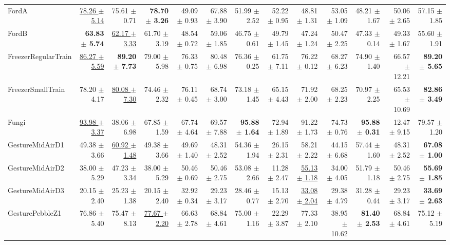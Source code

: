 \begin{landscape}
\begin{longtable}{lrrrrrrrrrrrr}
FordA & \underline{78.26 $\pm$ 5.14} & 75.61 $\pm$ 0.71 & \textbf{78.70 $\pm$ 3.26} & 49.09 $\pm$ 0.93 & 67.88 $\pm$ 3.90 & 51.99 $\pm$ 2.52 & 52.22 $\pm$ 0.95 & 48.81 $\pm$ 1.31 & 53.05 $\pm$ 1.09 & 48.21 $\pm$ 1.67 & 50.06 $\pm$ 2.65 & 57.15 $\pm$ 1.85 \\
FordB & \textbf{63.83 $\pm$ 5.74} & \underline{62.17 $\pm$ 3.33} & 61.70 $\pm$ 3.19 & 48.54 $\pm$ 0.72 & 59.06 $\pm$ 1.85 & 46.75 $\pm$ 0.61 & 49.79 $\pm$ 1.45 & 47.24 $\pm$ 1.24 & 50.47 $\pm$ 2.25 & 47.33 $\pm$ 0.14 & 49.33 $\pm$ 1.67 & 55.60 $\pm$ 1.91 \\
FreezerRegularTrain & \underline{86.27 $\pm$ 5.59} & \textbf{89.20 $\pm$ 7.73} & 79.00 $\pm$ 5.98 & 76.33 $\pm$ 0.75 & 80.48 $\pm$ 6.98 & 76.36 $\pm$ 0.25 & 61.75 $\pm$ 7.11 & 76.22 $\pm$ 0.12 & 68.27 $\pm$ 6.23 & 74.90 $\pm$ 1.40 & 66.57 $\pm$ 12.21 & \textbf{89.20 $\pm$ 5.65} \\
FreezerSmallTrain & 78.20 $\pm$ 4.17 & \underline{80.08 $\pm$ 7.30} & 74.46 $\pm$ 2.32 & 76.11 $\pm$ 0.45 & 68.74 $\pm$ 3.00 & 73.18 $\pm$ 1.45 & 65.15 $\pm$ 4.43 & 71.92 $\pm$ 2.00 & 68.25 $\pm$ 2.23 & 70.97 $\pm$ 2.25 & 65.53 $\pm$ 10.69 & \textbf{82.86 $\pm$ 3.49} \\
Fungi & \underline{93.98 $\pm$ 3.37} & 38.06 $\pm$ 6.98 & 67.85 $\pm$ 1.59 & 67.74 $\pm$ 4.64 & 69.57 $\pm$ 7.88 & \textbf{95.88 $\pm$ 1.64} & 72.94 $\pm$ 1.89 & 91.22 $\pm$ 1.73 & 74.73 $\pm$ 0.76 & \textbf{95.88 $\pm$ 0.31} & 12.47 $\pm$ 9.15 & 79.57 $\pm$ 1.20 \\
GestureMidAirD1 & 49.38 $\pm$ 3.66 & \underline{60.92 $\pm$ 1.48} & 49.38 $\pm$ 3.66 & 49.69 $\pm$ 1.40 & 48.31 $\pm$ 2.52 & 54.36 $\pm$ 1.94 & 26.15 $\pm$ 2.31 & 58.21 $\pm$ 2.22 & 44.15 $\pm$ 6.68 & 57.44 $\pm$ 1.60 & 48.31 $\pm$ 2.52 & \textbf{67.08 $\pm$ 1.00} \\
GestureMidAirD2 & 38.00 $\pm$ 5.29 & 47.23 $\pm$ 3.34 & 38.00 $\pm$ 5.29 & 50.46 $\pm$ 0.69 & 50.46 $\pm$ 2.75 & 53.08 $\pm$ 2.66 & 11.28 $\pm$ 2.47 & \underline{55.13 $\pm$ 1.18} & 34.00 $\pm$ 4.05 & 51.79 $\pm$ 1.18 & 50.46 $\pm$ 2.75 & \textbf{55.69 $\pm$ 1.85} \\
GestureMidAirD3 & 20.15 $\pm$ 2.40 & 25.23 $\pm$ 1.38 & 20.15 $\pm$ 2.40 & 32.92 $\pm$ 0.34 & 29.23 $\pm$ 3.17 & 28.46 $\pm$ 0.77 & 15.13 $\pm$ 2.70 & \underline{33.08 $\pm$ 2.04} & 29.38 $\pm$ 4.79 & 31.28 $\pm$ 0.44 & 29.23 $\pm$ 3.17 & \textbf{33.69 $\pm$ 2.63} \\
GesturePebbleZ1 & 76.86 $\pm$ 5.40 & 75.47 $\pm$ 8.13 & \underline{77.67 $\pm$ 2.20} & 66.63 $\pm$ 2.78 & 68.84 $\pm$ 4.61 & 75.00 $\pm$ 1.16 & 22.29 $\pm$ 3.87 & 77.33 $\pm$ 2.10 & 38.95 $\pm$ 10.62 & \textbf{81.40 $\pm$ 2.53} & 68.84 $\pm$ 4.61 & 75.12 $\pm$ 5.19 \\

\end{longtable}
\end{landscape}
